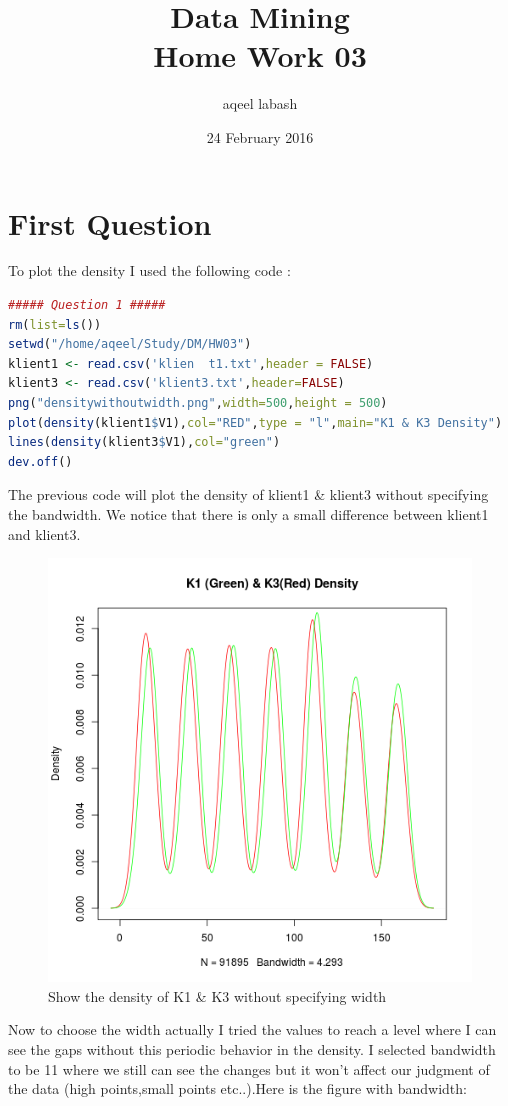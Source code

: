 \documentclass{article}
\title{Data Mining\\ Home Work 03}
\author{aqeel labash}
\date{24 February 2016}
\begin{document}
	\maketitle
		{\centering \section*{First Question}}
\begin{flushleft}
To plot the density I used the following code : 
\begin{lstlisting}[language=R]
##### Question 1 #####
rm(list=ls())
setwd("/home/aqeel/Study/DM/HW03")
klient1 <- read.csv('klien	t1.txt',header = FALSE)
klient3 <- read.csv('klient3.txt',header=FALSE)
png("densitywithoutwidth.png",width=500,height = 500)
plot(density(klient1$V1),col="RED",type = "l",main="K1 & K3 Density")
lines(density(klient3$V1),col="green")
dev.off()
\end{lstlisting}

The previous code will plot the density of klient1 \& klient3 without specifying the bandwidth. We notice that there is only a small difference between klient1 and klient3.
\begin{figure}[H]
\begin{center}
\includegraphics[scale=0.7]{densitywithoutwidth.png}
\end{center}
\caption{Show the density of K1 \& K3 without specifying width}
\end{figure}
Now to choose the width actually I tried the values to reach a level where I can see the gaps without this periodic behavior in the density. I selected bandwidth to be 11 where we still can see the changes but it won't affect our judgment of the data (high points,small points etc..).Here is the figure with bandwidth:
\begin{figure}[H]
	

\end{figure}
\end{flushleft}
\end{document}
